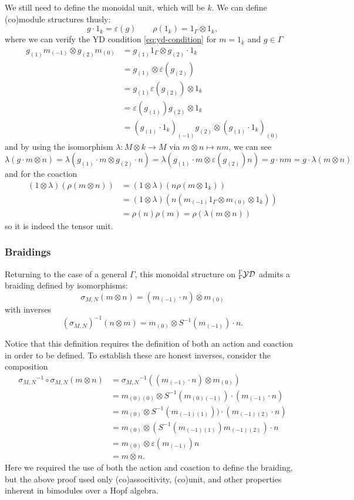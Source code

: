 \documentclass[12pt]{article}
\begin{document}
We still need to define the monoidal unit, which will be $k$. We can define (co)module structures thusly:
\[g\cdot 1_k=\varepsilon(g)\qquad \rho(1_k)=1_\Gamma\otimes 1_k,\]
where we can verify the YD condition \eqref{eq:yd-condition} for $m=1_k$ and $g\in \Gamma$
\begin{align*}
    g_{(1)}m_{(-1)}\otimes g_{(2)}m_{(0)}&= g_{(1)}1_\Gamma\otimes g_{(2)}\cdot 1_k\\
    &= g_{(1)}\otimes \varepsilon(g_{(2)})\\
    &= g_{(1)}\varepsilon(g_{(2)})\otimes 1_k\\
    &= \varepsilon(g_{(1)})g_{(2)}\otimes 1_k\\
    &= (g_{(1)}\cdot 1_k)_{(-1)}g_{(2)}\otimes (g_{(1)}\cdot 1_k)_{(0)}
\end{align*}
and by using the isomorphism $\lambda:M\otimes k\to M$ via $m\otimes n\mapsto nm$, we can see
\[\lambda(g\cdot m\otimes n)=\lambda(g_{(1)}\cdot m\otimes g_{(2)}\cdot n)=\lambda(g_{(1)}\cdot m\otimes\varepsilon(g_{(2)})n)=g\cdot nm=g\cdot\lambda(m\otimes n)\]
and for the coaction
\begin{align*}
    (1\otimes\lambda)(\rho(m\otimes n))&=(1\otimes\lambda)(n\rho(m\otimes 1_k))\\
    &=(1\otimes\lambda)(n(m_{(-1)}1_\Gamma\otimes m_{(0)}\otimes 1_k))\\
    &=\rho(n)\rho(m)=\rho(\lambda(m\otimes n))
\end{align*}
so it is indeed the tensor unit.

\subsubsection{Braidings}\label{subsubsec:braiding}
Returning to the case of a general $\Gamma$, this monoidal structure on ${^\Gamma_\Gamma\mathcal{YD}}$ admits a braiding defined by isomorphisms:
\[\sigma_{M,N}(m\otimes n)=(m_{(-1)}\cdot n)\otimes m_{(0)}\]
with inverses
\[(\sigma_{M,N})^{-1}(n\otimes m)=m_{(0)}\otimes S^{-1}(m_{(-1)})\cdot n.\]
\begin{rmk}
    Notice that this definition requires the definition of both an action and coaction in order to be defined. To establish these are honest inverses, consider the composition
    \begin{align*}
        {\sigma_{M,N}}^{-1}\circ\sigma_{M,N}(m\otimes n) &={\sigma_{M,N}}^{-1}((m_{(-1)}\cdot n)\otimes m_{(0)})\\
        &=m_{(0)(0)}\otimes S^{-1}(m_{(0)(-1)})\cdot(m_{(-1)}\cdot n)\\
        &=m_{(0)}\otimes S^{-1}(m_{(-1)(1)}))\cdot(m_{(-1)(2)}\cdot n)\\
        &=m_{(0)}\otimes (S^{-1}(m_{(-1)(1)})m_{(-1)(2)})\cdot n\\
        &=m_{(0)}\otimes \varepsilon(m_{(-1)})n\\
        &=m\otimes n.
    \end{align*}
    Here we required the use of both the action and coaction to define the braiding, but the above proof used only (co)associtivity, (co)unit, and other properties inherent in bimodules over a Hopf algebra.
\end{rmk}
\end{document}
